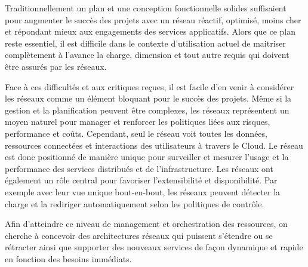 
Traditionnellement un plan et une conception fonctionnelle solides suffisaient pour augmenter le succès des projets avec un réseau réactif, optimisé, moins cher et répondant mieux aux engagements des services applicatifs. Alors que ce plan reste essentiel, il est difficile dans le contexte d'utilisation actuel de maitriser complètement  à l'avance la charge, dimension et tout autre requis qui doivent être assurés par les réseaux.

Face à ces difficultés et aux critiques reçues, il est facile d'en venir à considérer les réseaux comme un élément bloquant pour le succès des projets. Même si la gestion et la planification peuvent être complexes, les réseaux représentent un moyen naturel pour manager et renforcer les politiques liées aux risques, performance et coûts. Cependant, seul le réseau voit toutes les données, ressources connectées et interactions des utilisateurs à travers le Cloud. Le réseau est donc positionné de manière unique pour surveiller et mesurer l'usage et la performance des services distribués et de l'infrastructure. Les réseaux ont également un rôle central pour favoriser l'extensibilité et disponibilité. Par exemple avec leur vue unique bout-en-bout, les réseaux peuvent détecter la charge et la rediriger automatiquement selon les politiques de contrôle.

Afin d'atteindre ce niveau de management et orchestration des ressources, on cherche  à concevoir des architectures réseaux qui puissent s'étendre ou se rétracter ainsi que supporter des nouveaux services de façon dynamique et rapide en fonction des besoins immédiats. \cite{ibmPlanningVirtCCchap4} \cite{cloudAutomation} \cite{hpCloudEffectsOnNetworkIntro}


